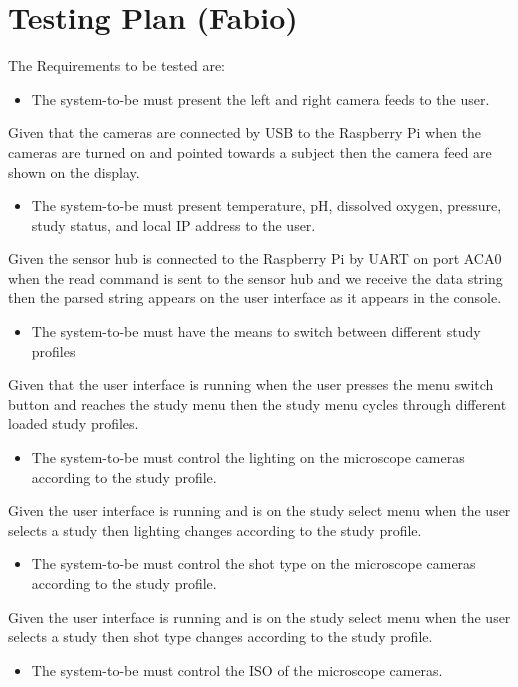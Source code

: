 \section{Testing Plan (Fabio)}
The Requirements to be tested are:
\begin{itemize}
	\item The system-to-be must present the left and right camera feeds to the user.
\end{itemize}
Given that the cameras are connected by USB to the Raspberry Pi when the cameras are turned on and pointed towards a subject then the camera feed are shown on the display.
\begin{itemize}
	\item The system-to-be must present temperature, pH, dissolved oxygen, pressure, study status, and local IP address to the user.
\end{itemize}
Given the sensor hub is connected to the Raspberry Pi by UART on port ACA0 when the read command is sent to the sensor hub and we receive the data string then the parsed string appears on the user interface as it appears in the console.
\begin{itemize}
	\item The system-to-be must have the means to switch between different study profiles
\end{itemize}
Given that the user interface is running when the user presses the menu switch button and reaches the study menu then the study menu cycles through different loaded study profiles.
\begin{itemize}
	\item The system-to-be must control the lighting on the microscope cameras according to the study profile.
\end{itemize}
Given the user interface is running and is on the study select menu when the user selects a study then lighting changes according to the study profile.
\begin{itemize}
	\item The system-to-be must control the shot type on the microscope cameras according to the study profile.
\end{itemize}
Given the user interface is running and is on the study select menu when the user selects a study then  shot type changes according to the study profile.
\begin{itemize}
	\item The system-to-be must control the ISO of the microscope cameras.
\end{itemize}
